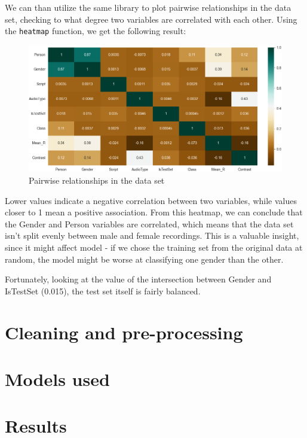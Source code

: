 \documentclass[11pt, letterpaper]{article}
\begin{document}
We can than utilize the same library to plot pairwise relationships in the data set, checking to what degree two variables are correlated with each other. Using the \verb|heatmap| function, we get the following result:

\begin{figure}[H]
    \centering
    \includegraphics[width=1\linewidth]{pairplot.png}
    \caption{Pairwise relationships in the data set}
    \label{fig:enter-label}
\end{figure}

Lower values indicate a negative correlation between two variables, while values closer to 1 mean a positive association. From this heatmap, we can conclude that the Gender and Person variables are correlated, which means that the data set isn't split evenly between male and female recordings. This is a valuable insight, since it might affect model - if we chose the training set from the original data at random, the model might be worse at classifying one gender than the other.

Fortunately, looking at the value of the intersection between Gender and IsTestSet (0.015), the test set itself is fairly balanced.

\section{Cleaning and pre-processing}
\section{Models used}
\section{Results}
\end{document}
